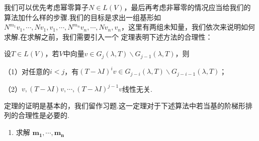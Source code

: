 我们可以优先考虑幂零算子$N\in L(V)$，最后再考虑非幂零的情况应当给我们的算法加什么样的步骤.我们的目标是求出一组基形如
$N^{m_1}v_1,\cdots,Nv_1,v_1,\cdots,N^{m_n}v_n,\cdots,Nv_n,v_n$，这里有两组未知量，我们依次来说明如何求解.在求解之前，我们需要引入一个
定理表明下述方法的合理性：
\begin{theorem}
	设$T\in L(V)$，若$V$中向量$v\in G_j(\lambda,T)\backslash G_{j-1}(\lambda,T)$，则

	\textup{（1）}对任意的$i<j$，有$(T-\lambda I)^iv\in G_{j-i}(\lambda,T)\backslash G_{j-i-1}(\lambda,T)$；

	\textup{（2）}$v,(T-\lambda I)v,\cdots,(T-\lambda I)^{j-1}v$线性无关.
\end{theorem}
定理的证明是基本的，我们留作习题.这一定理对于下述算法中若当基的阶梯形排列的合理性是必要的.
\begin{enumerate}
	\item $\textbf{求解 }\bm{m_1,\cdots,m_n}$
	

\end{enumerate}

